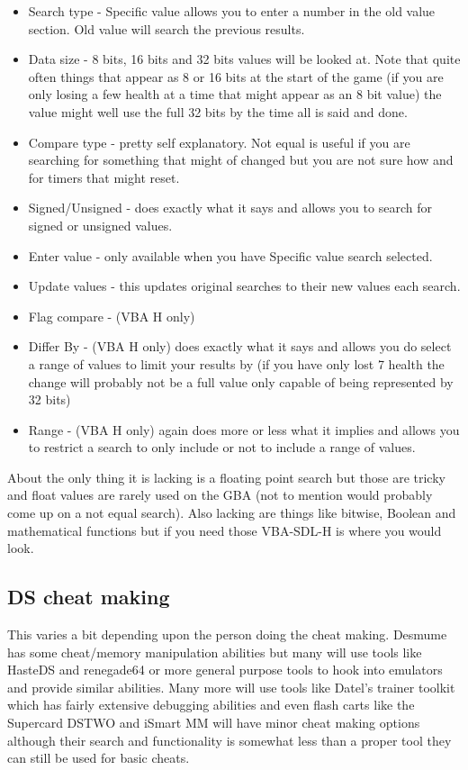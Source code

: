 \documentclass[
]{book}
\providecommand{\tightlist}{%
  \setlength{\itemsep}{0pt}\setlength{\parskip}{0pt}}
\begin{document}
\begin{itemize}
\tightlist
\item
  Search type - Specific value allows you to enter a number in the old value section. Old value will search the previous results.
\item
  Data size - 8 bits, 16 bits and 32 bits values will be looked at. Note that quite often things that appear as 8 or 16 bits at the start of the game (if you are only losing a few health at a time that might appear as an 8 bit value) the value might well use the full 32 bits by the time all is said and done.
\item
  Compare type - pretty self explanatory. Not equal is useful if you are searching for something that might of changed but you are not sure how and for timers that might reset.
\item
  Signed/Unsigned - does exactly what it says and allows you to search for signed or unsigned values.
\item
  Enter value - only available when you have Specific value search selected.
\item
  Update values - this updates original searches to their new values each search.
\item
  Flag compare - (VBA H only)
\item
  Differ By - (VBA H only) does exactly what it says and allows you do select a range of values to limit your results by (if you have only lost 7 health the change will probably not be a full value only capable of being represented by 32 bits)
\item
  Range - (VBA H only) again does more or less what it implies and allows you to restrict a search to only include or not to include a range of values.
\end{itemize}

About the only thing it is lacking is a floating point search but those are tricky and float values are rarely used on the GBA (not to mention would probably come up on a not equal search). Also lacking are things like bitwise, Boolean and mathematical functions but if you need those VBA-SDL-H is where you would look.

\hypertarget{ds-cheat-making}{%
\subsection{DS cheat making}\label{ds-cheat-making}}

This varies a bit depending upon the person doing the cheat making. Desmume has some cheat/memory manipulation abilities but many will use tools like HasteDS and renegade64 or more general purpose tools to hook into emulators and provide similar abilities. Many more will use tools like Datel's trainer toolkit which has fairly extensive debugging abilities and even flash carts like the Supercard DSTWO and iSmart MM will have minor cheat making options although their search and functionality is somewhat less than a proper tool they can still be used for basic cheats.
\end{document}
